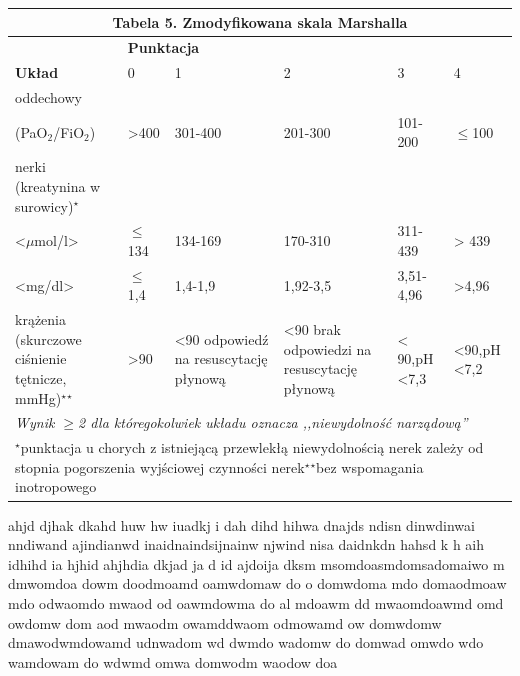 \documentclass[a4paper, 12pt]{report}
\begin{document}
\begin{table}[!h]
\begin{center}
\begin{footnotesize}
\begin{tabular}{|p{3cm} | p{0.8cm} p{2.4cm} p{2.6cm} p{1.4cm} p{1.3cm}|}
\hline
\multicolumn{6}{|c|}{\cellcolor[gray]{0.9} \textbf{Tabela
  5. Zmodyfikowana skala Marshalla}}\\
\hline \hline
 & \multicolumn{5}{l|}{\textbf{Punktacja}}\\
\cline{2-6}
\textbf{Układ} & 0 & 1 & 2 & 3 & 4\\
\hline
oddechowy & \multicolumn{5}{l|}{}\\
 (PaO$_2$/FiO$_2$) & >400 & 301-400 & 201-300 & 101-200 & $\leq$100\\
\hline
nerki (kreatynina w surowicy)$^\star$ & \multicolumn{5}{l|}{}\\
<$\mu$mol/l> & $\leq$134 & 134-169 & 170-310 & 311-439 & > 439\\
<mg/dl> & $\leq$1,4 & 1,4-1,9 & 1,92-3,5 & 3,51-4,96 & >4,96\\
\hline
krążenia (skurczowe ciśnienie tętnicze, mmHg)$^\star$$^\star$ 
& >90 & <90 odpowiedź na resuscytację płynową 
& <90 brak odpowiedzi na resuscytację płynową 
& < 90,\newline pH <7,3 & <90,\newline pH <7,2\\ 
\hline \hline
\multicolumn{6}{|p{13cm}|}{\textsl{Wynik $\geq$2 dla któregokolwiek układu
  oznacza ,,niewydolność narządową''}}\\
\hline
\multicolumn{6}{|p{13cm}|}{\scriptsize{$^\star$punktacja u chorych z istniejącą przewlekłą
  niewydolnością nerek zależy od stopnia pogorszenia wyjściowej
  czynności nerek\newline $^\star$$^\star$bez wspomagania inotropowego}}\\
\hline
\end{tabular}
\end{footnotesize}
\end{center}
\end{table}

ahjd djhak dkahd huw hw iuadkj i dah dihd hihwa dnajds ndisn
dinwdinwai nndiwand ajindianwd inaidnaindsijnainw njwind nisa daidnkdn 
hahsd k h aih idhihd ia hjhid ahjhdia dkjad ja d id ajdoija dksm
msomdoasmdomsadomaiwo m dmwomdoa dowm doodmoamd oamwdomaw do o
domwdoma mdo domaodmoaw mdo odwaomdo mwaod od oawmdowma do al mdoawm
dd mwaomdoawmd omd owdomw dom aod mwaodm owamddwaom  odmowamd ow
domwdomw dmawodwmdowamd udnwadom wd  dwmdo wadomw do  domwad omwdo wdo
wamdowam do wdwmd omwa domwodm waodow doa
\end{document}
